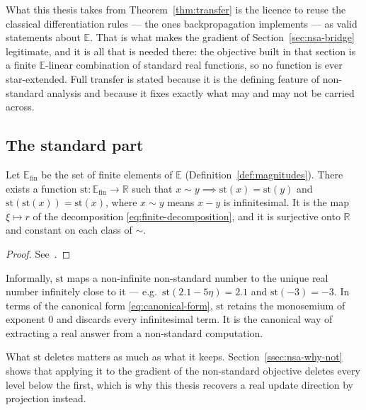 What this thesis takes from Theorem~\ref{thm:transfer} is the licence to reuse the
classical differentiation rules --- the ones backpropagation implements --- as valid
statements about $\mathbb{E}$. That is what makes the gradient of
Section~\ref{sec:nsa-bridge} legitimate, and it is all that is needed there: the
objective built in that section is a finite $\mathbb{E}$-linear combination of
standard real functions, so no function is ever star-extended. Full transfer is
stated because it is the defining feature of non-standard analysis and because it
fixes exactly what may and may not be carried across.

\subsection{The standard part}
\label{sec:standard-part}

\begin{theorem}
\label{thm:standard-part}
Let $\mathbb{E}_{\mathrm{fin}}$ be the set of finite elements of $\mathbb{E}$
(Definition~\ref{def:magnitudes}). There exists a function
$\mathrm{st} : \mathbb{E}_{\mathrm{fin}} \to \mathbb{R}$ such
that $x \sim y \implies \mathrm{st}(x) = \mathrm{st}(y)$ and
$\mathrm{st}(\mathrm{st}(x)) = \mathrm{st}(x)$, where $x \sim y$ means $x-y$ is
infinitesimal. It is the map $\xi \mapsto r$ of the decomposition
\eqref{eq:finite-decomposition}, and it is surjective onto $\mathbb{R}$ and constant
on each class of $\sim$.
\end{theorem}

\begin{proof}
See~\cite{benci2019measure}.
\end{proof}

Informally, $\mathrm{st}$ maps a non-infinite non-standard number to the unique real
number infinitely close to it --- e.g.\ $\mathrm{st}(2.1-5\eta)=2.1$ and
$\mathrm{st}(-3)=-3$. In terms of the canonical form
\eqref{eq:canonical-form}, $\mathrm{st}$ retains the monosemium of exponent $0$ and
discards every infinitesimal term. It is the canonical way of extracting a real
answer from a non-standard computation.

What $\mathrm{st}$ deletes matters as much as what it keeps.
Section~\ref{ssec:nsa-why-not} shows that applying it to the gradient of the
non-standard objective deletes every level below the first, which is why this thesis
recovers a real update direction by projection instead.

